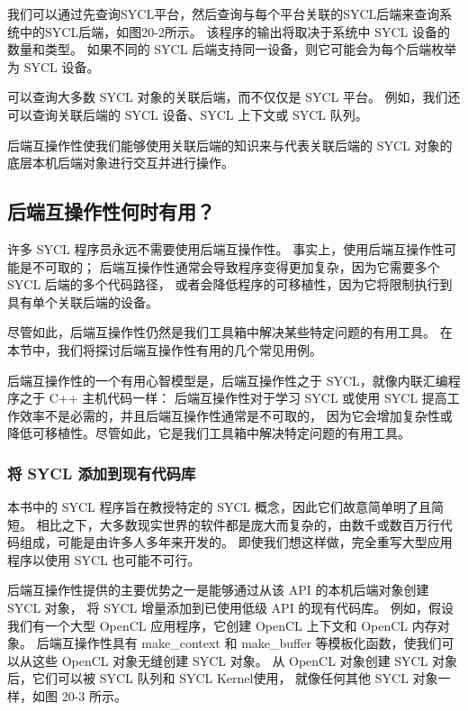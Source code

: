 我们可以通过先查询SYCL平台，然后查询与每个平台关联的SYCL后端来查询系统中的SYCL后端，如图20-2所示。 
该程序的输出将取决于系统中 SYCL 设备的数量和类型。 
如果不同的 SYCL 后端支持同一设备，则它可能会为每个后端枚举为 SYCL 设备。

可以查询大多数 SYCL 对象的关联后端，而不仅仅是 SYCL 平台。 
例如，我们还可以查询关联后端的 SYCL 设备、SYCL 上下文或 SYCL 队列。

后端互操作性使我们能够使用关联后端的知识来与代表关联后端的 SYCL 对象的底层本机后端对象进行交互并进行操作。

\subsection{后端互操作性何时有用？}
许多 SYCL 程序员永远不需要使用后端互操作性。 事实上，使用后端互操作性可能是不可取的； 
后端互操作性通常会导致程序变得更加复杂，因为它需要多个 SYCL 后端的多个代码路径，
或者会降低程序的可移植性，因为它将限制执行到具有单个关联后端的设备。

尽管如此，后端互操作性仍然是我们工具箱中解决某些特定问题的有用工具。 
在本节中，我们将探讨后端互操作性有用的几个常见用例。

\begin{remark}[后端互操作性就像一个内联汇编程序]
后端互操作性的一个有用心智模型是，后端互操作性之于 SYCL，就像内联汇编程序之于 C++ 主机代码一样：
后端互操作性对于学习 SYCL 或使用 SYCL 提高工作效率不是必需的，并且后端互操作性通常是不可取的，
因为它会增加复杂性或降低可移植性。尽管如此，它是我们工具箱中解决特定问题的有用工具。
\end{remark}

\subsubsection{将 SYCL 添加到现有代码库}
本书中的 SYCL 程序旨在教授特定的 SYCL 概念，因此它们故意简单明了且简短。 
相比之下，大多数现实世界的软件都是庞大而复杂的，由数千或数百万行代码组成，可能是由许多人多年来开发的。 
即使我们想这样做，完全重写大型应用程序以使用 SYCL 也可能不可行。

后端互操作性提供的主要优势之一是能够通过从该 API 的本机后端对象创建 SYCL 对象，
将 SYCL 增量添加到已使用低级 API 的现有代码库。 
例如，假设我们有一个大型 OpenCL 应用程序，它创建 OpenCL 上下文和 OpenCL 内存对象。 
后端互操作性具有 make\_context 和 make\_buffer 等模板化函数，使我们可以从这些 OpenCL 对象无缝创建 SYCL 对象。 
从 OpenCL 对象创建 SYCL 对象后，它们可以被 SYCL 队列和 SYCL Kernel使用，
就像任何其他 SYCL 对象一样，如图 20-3 所示。

